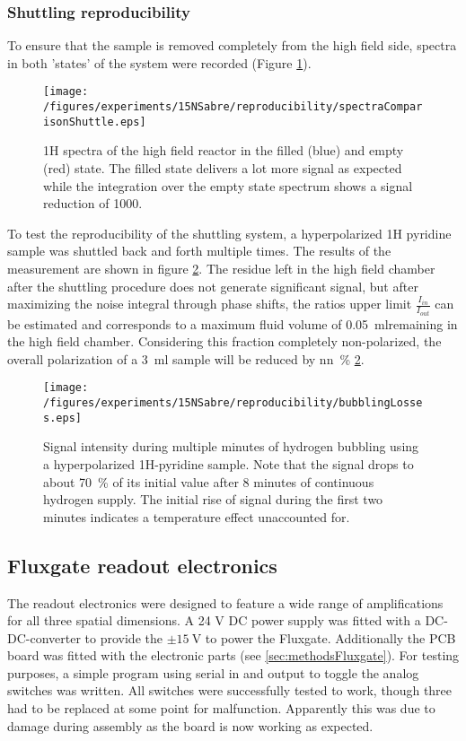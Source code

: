         \subsubsection{Shuttling reproducibility}
            To ensure that the sample is removed completely from the high field side, spectra in both 'states' of the system were recorded (Figure \ref{fig:results:15N:shuttlingRemoval}).
            \begin{figure}
                \centering
                \texttt{[image: /figures/experiments/15NSabre/reproducibility/spectraComparisonShuttle.eps]}
                \caption[High field removal efficiency]{1H spectra of the high field reactor in the filled (blue) and empty (red) state. The filled state delivers a lot more signal as expected while the integration over the empty state spectrum shows a signal reduction of 1000.}
                \label{fig:results:15N:shuttlingRemoval}
            \end{figure}
            To test the reproducibility of the shuttling system, a hyperpolarized 1H pyridine sample was shuttled back and forth multiple times. The results of the measurement are shown in figure \ref{fig:results:15N:shuttlingReproducibility}. The residue left in the high field chamber after the shuttling procedure does not generate significant signal, but after maximizing the noise integral through phase shifts, the ratios upper limit $\frac{I_{in}}{I_{out}}$ can be estimated and corresponds to a maximum fluid volume of \SI{0.05}{ml}remaining in the high field chamber. Considering this fraction completely non-polarized, the overall polarization of a \SI{3}{ml} sample will be reduced by \SI{nn}{\percent} \ref{fig:results:15N:shuttlingReproducibility}.
            \begin{figure}
                \label{fig:results:15N:shuttlingReproducibility}
                \centering
                \texttt{[image: /figures/experiments/15NSabre/reproducibility/bubblingLosses.eps]}
                \caption[Bubbling fluid losses]{Signal intensity during multiple minutes of hydrogen bubbling using a hyperpolarized 1H-pyridine sample. Note that the signal drops to about \SI{70}{\percent} of its initial value after 8 minutes of continuous hydrogen supply. The initial rise of signal during the first two minutes indicates a temperature effect unaccounted for.}
            \end{figure}
    \subsection{Fluxgate readout electronics}
        The readout electronics were designed to feature a wide range of amplifications for all three spatial dimensions. A 24 V DC power supply was fitted with a DC-DC-converter to provide the $\pm\SI{15}{\volt}$ to power the Fluxgate. Additionally the PCB board was fitted with the electronic parts (see \ref{sec:methodsFluxgate}). For testing purposes, a simple program using serial in and output to toggle the analog switches was written. All switches were successfully tested to work, though three had to be replaced at some point for malfunction.  Apparently this was due to damage during assembly as the board is now working as expected.
